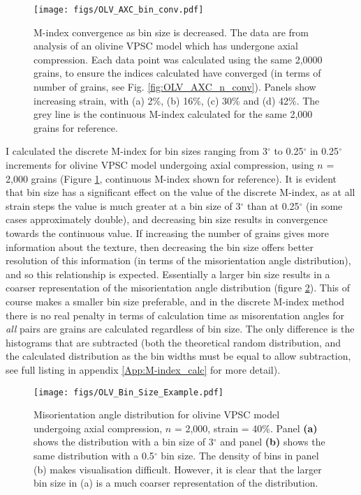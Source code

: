 \documentclass[a4paper,12pt]{report}
\numberwithin{equation}{chapter}
\begin{document}
\begin{figure}[b!]
  \centering
    \texttt{[image: figs/OLV\_AXC\_bin\_conv.pdf]}
  \caption[Convergence with bin size (olivine)]{M-index convergence as bin size is decreased. The data are from analysis of an olivine VPSC model which has undergone axial compression. Each data point was calculated using the same 2,0000 grains, to ensure the indices calculated have converged (in terms of number of grains, see Fig. \ref{fig:OLV_AXC_n_conv}). Panels show increasing strain, with (a) 2\%, (b) 16\%, (c) 30\% and (d) 42\%. The grey line is the continuous M-index calculated for the same 2,000 grains for reference.}
  \label{fig:OLV_AXC_b_conv}
\end{figure}  

I calculated the discrete M-index for bin sizes ranging from 3$^\circ$ to 0.25$^\circ$ in 0.25$^\circ$ increments for olivine VPSC model undergoing axial compression, using $n$ = 2,000 grains (Figure \ref{fig:OLV_AXC_b_conv}, continuous M-index shown for reference). It is evident that bin size has a significant effect on the value of the discrete M-index, as at all strain steps the value is much greater at a bin size of 3$^\circ$ than at 0.25$^\circ$ (in some cases approximately double), and decreasing bin size results in convergence towards the continuous value. If increasing the number of grains gives more information about the texture, then decreasing the bin size offers better resolution of this information (in terms of the misorientation angle distribution), and so this relationship is expected. Essentially a larger bin size results in a coarser representation of the misorientation angle distribution (figure \ref{fig:OLV_bin_size_example}). This of course makes a smaller bin size preferable, and in the discrete M-index method there is no real penalty in terms of calculation time as misorentation angles for \emph{all} pairs are grains are calculated regardless of bin size. The only difference is the histograms that are subtracted (both the theoretical random distribution, and the calculated distribution as the bin widths must be equal to allow subtraction, see full listing in appendix \ref{App:M-index_calc} for more detail).

\begin{figure}[h]
  \centering
    \texttt{[image: figs/OLV\_Bin\_Size\_Example.pdf]}
  \caption[Bin size example (olivine VPSC)]{Misorientation angle distribution for olivine VPSC model undergoing axial compression, $n$ = 2,000, strain = 40\%. Panel \textbf{(a)} shows the distribution with a bin size of 3$^\circ$ and panel \textbf{(b)} shows the same distribution with a 0.5$^\circ$ bin size. The density of bins in panel (b) makes visualisation difficult. However, it is clear that the larger bin size in (a) is a much coarser representation of the distribution.}
  \label{fig:OLV_bin_size_example}
\end{figure}  
\end{document}
